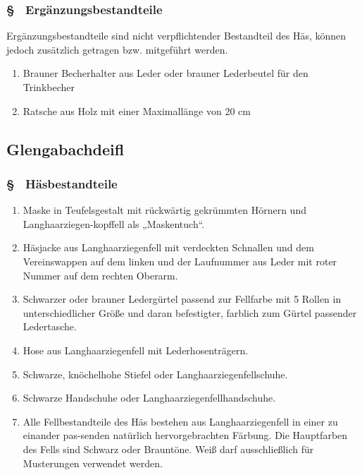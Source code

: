 \subsubsection{§ \thehoparagraphcounter\ Ergänzungsbestandteile} \label{ho:par:ergaenzungsbestandteile_kropfschell}
Ergänzungsbestandteile sind nicht verpflichtender Bestandteil des Häs, können jedoch zusätzlich getragen bzw. mitgeführt werden.
\begin{enumerate}
    \item \label{ho:abs:kpyvqx} Brauner Becherhalter aus Leder oder brauner Lederbeutel für den Trinkbecher
    
    \item \label{ho:abs:un05xj} Ratsche aus Holz mit einer Maximallänge von 20 cm
\end{enumerate}

\subsection{Glengabachdeifl}
\subsubsection{§ \thehoparagraphcounter\ Häsbestandteile} \label{ho:par:haesbestandteile_glengabachdeifl}
\begin{enumerate}
    \item \label{ho:abs:hic9ih} Maske in Teufelsgestalt mit rückwärtig gekrümmten Hörnern und Langhaarziegen-kopffell als „Maskentuch“.
    
    \item \label{ho:abs:fy2h7c} Häsjacke aus Langhaarziegenfell mit verdeckten Schnallen und dem Vereinswappen auf dem linken und der Laufnummer aus Leder mit roter Nummer auf dem rechten Oberarm.
    
    \item \label{ho:abs:z0nwwr} Schwarzer oder brauner Ledergürtel passend zur Fellfarbe mit 5 Rollen in unterschiedlicher Größe und daran befestigter, farblich zum Gürtel passender Ledertasche.
    
    \item \label{ho:abs:jyaskx} Hose aus Langhaarziegenfell mit Lederhosenträgern.
    
    \item \label{ho:abs:iwbmyc} Schwarze, knöchelhohe Stiefel oder Langhaarziegenfellschuhe.
    
    \item \label{ho:abs:rn3t0v} Schwarze Handschuhe oder Langhaarziegenfellhandschuhe.
    
    \item \label{ho:abs:chlnk9} Alle Fellbestandteile des Häs bestehen aus Langhaarziegenfell in einer zu einander pas-senden natürlich hervorgebrachten Färbung. Die Hauptfarben des Fells sind Schwarz oder Brauntöne. Weiß darf ausschließlich für Musterungen verwendet werden.
\end{enumerate}

